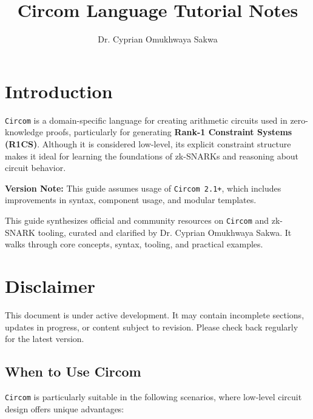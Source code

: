 \documentclass{article}
\title{Circom Language Tutorial Notes}
\author{Dr. Cyprian Omukhwaya Sakwa}
\date{}
\begin{document}
	
	\maketitle
	
	\section{Introduction}
	
	\texttt{Circom} is a domain-specific language for creating arithmetic circuits used in zero-knowledge proofs, particularly for generating \textbf{Rank-1 Constraint Systems (R1CS)}. Although it is considered low-level, its explicit constraint structure makes it ideal for learning the foundations of zk-SNARKs and reasoning about circuit behavior.
	
	\begin{noteBox}
		\textbf{Version Note:} This guide assumes usage of \texttt{Circom 2.1+}, which includes improvements in syntax, component usage, and modular templates.
	\end{noteBox}
	
	This guide synthesizes official and community resources on \texttt{Circom} and zk-SNARK tooling, curated and clarified by Dr. Cyprian Omukhwaya Sakwa. It walks through core concepts, syntax, tooling, and practical examples.
	\section*{Disclaimer}
	
	This document is under active development. It may contain incomplete sections, updates in progress, or content subject to revision. Please check back regularly for the latest version.
	
	\subsection{When to Use Circom}
	
	\texttt{Circom} is particularly suitable in the following scenarios, where low-level circuit design offers unique advantages:
	
\end{document}
